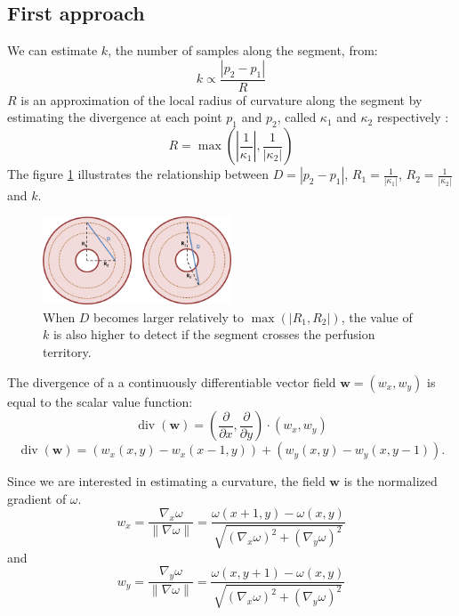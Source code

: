 \documentclass[11pt,a4paper]{article}
\newcommand{\mydiv}{\ensuremath{\operatorname{div}}}
\newcommand{\myvec}[1]{\ensuremath{\mathbf{#1}}}
\begin{document}
	\subsection{First approach} \label{firstaproach}

We can estimate $k$, the number of samples along the segment, from:
\begin{equation}
k \propto \frac{|p_2 - p_1|}{R}
\end{equation}
$R$ is an approximation of the local radius of curvature along the segment by estimating the divergence at each point $p_1$ and $p_2$, called $\kappa_1$ and $\kappa_2$ respectively :
\begin{equation}
R = \max(|\frac{1}{\kappa_1}|, \frac{1}{|\kappa_2|})
\end{equation} 
The figure \ref{example} illustrates the relationship between $D = |p_2 - p_1|$, $R_1= \frac{1}{|\kappa_1|}$, $R_2=\frac{1}{|\kappa_2|}$ and $k$. 
\begin{figure}[h!]
\centering
\includegraphics[width=0.5\textwidth]{Drawings/CurvatureTestExample.png}
\caption{When $D$ becomes larger relatively to $\max(|R_1, R_2|)$, the value of $k$ is also higher to detect if the segment crosses the perfusion territory.}
\label{example}
\end{figure}

The divergence of a a continuously differentiable vector field $\myvec{w}=(w_x,w_y)$ is equal to the scalar value function:
\begin{equation}
\mydiv (\myvec{w}) = (\frac{\partial}{\partial x}, \frac{\partial}{\partial y}) \cdot (w_x, w_y) 
\end{equation}
\begin{equation}
\mydiv (\myvec{w}) = \left( w_x(x, y) - w_x(x-1, y) \right) + \left( w_y(x, y) - w_y(x, y - 1) \right).
\end{equation}

Since we are interested in estimating a curvature, the field $\myvec{w}$ is the normalized gradient of $\omega$.
\begin{equation}
w_x = \frac{\nabla_x \omega}{\|\nabla \omega\|} = \frac{\omega (x + 1, y) - \omega (x, y)}{\sqrt{(\nabla_x\omega)^2 + (\nabla_y\omega)^2}}
\end{equation}
and
\begin{equation}
w_y = \frac{\nabla_y \omega}{\|\nabla \omega\|} = \frac{\omega (x, y + 1) - \omega (x, y)}{\sqrt{(\nabla_x\omega)^2 + (\nabla_y\omega)^2}}
\end{equation}	
\end{document}
